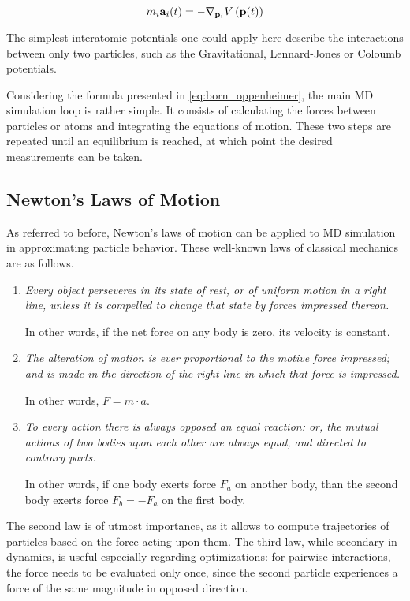 \begin{equation}
	m_i\mathbf{a}_i(t) = -\nabla_{\mathbf{p}_i} V\left(\mathbf{p}(t)\right)\label{eq:born_oppenheimer}
\end{equation}

The simplest interatomic potentials one could apply here describe the interactions between only two particles, such as the Gravitational, Lennard-Jones or Coloumb potentials. \cite{Griebel2007}

Considering the formula presented in \eqref{eq:born_oppenheimer}, the main MD simulation loop is rather simple. It consists of calculating the forces between particles or atoms and integrating the equations of motion. These two steps are repeated until an equilibrium is reached, at which point the desired measurements can be taken. \cite{Frenkel2002}





\subsection{Newton's Laws of Motion}
\label{sec:newton}
As referred to before, Newton's laws of motion can be applied to MD simulation in approximating particle behavior. These well-known laws of classical mechanics are as follows. \cite{Newton1934}
\begin{enumerate}[label=\Roman*.]
	\item \textit{Every object perseveres in its state of rest, or of uniform motion in a right line, unless it is compelled to change that state by forces impressed thereon.}

	      In other words, if the net force on any body is zero, its velocity is constant.
	\item \textit{The alteration of motion is ever proportional to the motive force impressed; and is made in the direction of the right line in which that force is impressed.}

	      In other words, $F=m\cdot a$.
	\item \textit{To every action there is always opposed an equal reaction: or, the mutual actions of two bodies upon each other are always equal, and directed to contrary parts.}

	      In other words, if one body exerts force $F_a$ on another body, than the second body exerts force $F_b=-F_a$ on the first body.
\end{enumerate}

The second law is of utmost importance, as it allows to compute trajectories of particles based on the force acting upon them. The third law, while secondary in dynamics, is useful especially regarding optimizations: for pairwise interactions, the force needs to be evaluated only once, since the second particle experiences a force of the same magnitude in opposed direction. \cite{Gratl2021}

